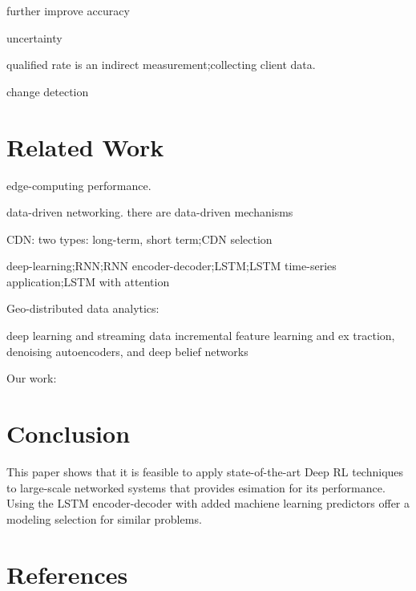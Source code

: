 \documentclass[review]{elsarticle}
\begin{document}
further improve accuracy

uncertainty

qualified rate is an indirect measurement;collecting client data.

change detection
\section{Related Work}
edge-computing performance.\cite{SatyanarayananTheComputing}

data-driven networking. there are data-driven mechanisms

CDN: two types: long-term, short term;CDN selection \cite{Jiang2017Pytheas:Exploration-Exploitation}

deep-learning;RNN;RNN encoder-decoder;LSTM;LSTM time-series application;LSTM with attention

Geo-distributed data analytics:

deep learning and streaming data \cite{Najafabadi2015DeepAnalytics} incremental feature learning and ex traction, denoising autoencoders, and deep belief networks


Our work:
    \cite{Wang2017}

\section{Conclusion}
This paper shows that it is feasible to apply state-of-the-art Deep RL techniques to large-scale networked systems that provides esimation for its performance. Using the LSTM encoder-decoder with added machiene learning predictors offer a modeling selection for similar problems.
\section*{References}



\end{document}
